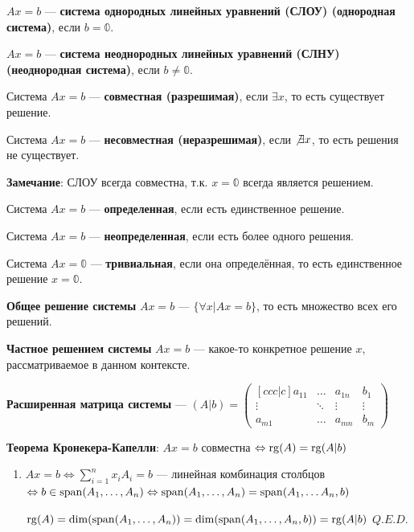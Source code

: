 \(Ax = b\) --- \textbf{система однородных линейных уравнений (СЛОУ) (однородная система)}, если \(b = \mathbb{0}\).

\(Ax = b\) --- \textbf{система неоднородных линейных уравнений (СЛНУ) (неоднородная система)}, если \(b \neq \mathbb{0}\).

Система \(Ax = b\) --- \textbf{совместная (разрешимая)}, если \(\exists x\), то есть существует решение.

Система \(Ax = b\) --- \textbf{несовместная (неразрешимая)}, если \(\not\exists x\), то есть решения не существует.

\textbf{Замечание}: СЛОУ всегда совместна, т.к. \(x = \mathbb{0}\) всегда является решением.

Система \(Ax = b\) --- \textbf{определенная}, если есть единственное решение.

Система \(Ax = b\) --- \textbf{неопределенная}, если есть более одного решения.

Система \(Ax = \mathbb{0}\) --- \textbf{тривиальная}, если она определённая, то есть единственное решение \(x = \mathbb{0}\).

\textbf{Общее решение системы} \(Ax = b\) --- \(\{\forall x | Ax = b\}\), то есть множество всех его решений.

\textbf{Частное решением системы} \(Ax = b\) --- какое-то конкретное решение \(x\), рассматриваемое в данном контексте.

\textbf{Расширенная матрица системы} --- \((A | b) =
\begin{pmatrix}[ccc|c]
    a_{11} & \ldots & a_{1n} & b_1    \\
    \vdots & \ddots & \vdots & \vdots \\
    a_{m1} & \ldots & a_{mn} & b_m
\end{pmatrix}\)

\textbf{Теорема Кронекера-Капелли}: \(Ax = b\) совместна \(\Leftrightarrow \operatorname{rg}(A) = \operatorname{rg}(A|b)\)

\begin{enumerate}
    \item[] \prooff{}
          \(Ax = b \Leftrightarrow \sum\limits_{i=1}^n x_i A_i = b\) --- линейная комбинация столбцов \(\Leftrightarrow b \in \operatorname{span}(A_1, \ldots, A_n) \Leftrightarrow \operatorname{span}(A_1, \ldots, A_n) = \operatorname{span}(A_1,\ldots A_n, b)\)

          \(\operatorname{rg}(A) = \dim(\operatorname{span}(A_1,\ldots, A_n)) = \dim(\operatorname{span}(A_1, \ldots, A_n, b)) = \operatorname{rg}(A | b)\) \(Q.E.D.\)

\end{enumerate}


